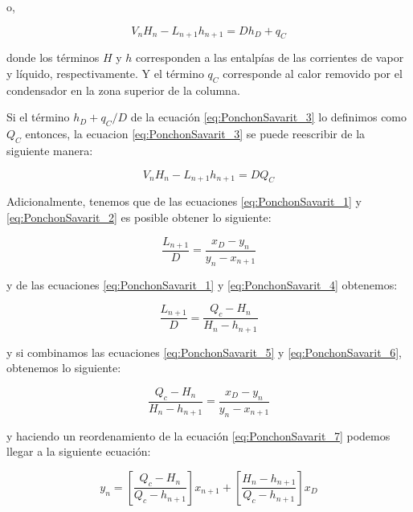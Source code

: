\documentclass[11pt]{book}
\begin{document}
o, 

\begin{equation}
    \label{eq:PonchonSavarit_3}
    V_n  H_n - L_{n+1} h_{n+1} = D h_D + q_C
\end{equation}

donde los términos $H$ y $h$ corresponden a las entalpías de las corrientes de vapor y líquido, respectivamente. Y el término $q_C$ corresponde al calor removido por el condensador en la zona superior de la columna.

Si el término $h_D + q_C/D$ de la ecuación \ref{eq:PonchonSavarit_3} lo definimos como $Q_C$ entonces, la ecuacion \ref{eq:PonchonSavarit_3} se puede reescribir de la siguiente manera:

\begin{equation}
    \label{eq:PonchonSavarit_4}
    V_n H_n - L_{n+1} h_{n+1} = DQ_C
\end{equation}

Adicionalmente, tenemos que de las ecuaciones \ref{eq:PonchonSavarit_1} y \ref{eq:PonchonSavarit_2} es posible obtener lo siguiente:

\begin{equation}
    \label{eq:PonchonSavarit_5}
    \frac{L_{n+1}}{D} = \frac{x_D - y_n}{y_n - x_{n+1}}
\end{equation}

y de las ecuaciones \ref{eq:PonchonSavarit_1} y \ref{eq:PonchonSavarit_4} obtenemos:

\begin{equation}
    \label{eq:PonchonSavarit_6}
    \frac{L_{n+1}}{D} = \frac{Q_c - H_n}{H_n - h_{n+1}}
\end{equation}

y si combinamos las ecuaciones \ref{eq:PonchonSavarit_5} y \ref{eq:PonchonSavarit_6}, obtenemos lo siguiente:

\begin{equation}
    \label{eq:PonchonSavarit_7}
    \frac{Q_c - H_n}{H_n - h_{n+1}} = \frac{x_D - y_n}{y_n - x_{n+1}}
\end{equation}

y haciendo un reordenamiento de la ecuación \ref{eq:PonchonSavarit_7} podemos llegar a la siguiente ecuación:

\begin{equation}
    \label{eq:PonchonSavarit_8}
    y_n = \left[ \frac{Q_c - H_n}{Q_c - h_{n+1}} \right] x_{n+1} + \left[ \frac{H_n - h_{n+1}}{Q_c - h_{n+1}} \right] x_D
\end{equation}
\end{document}
